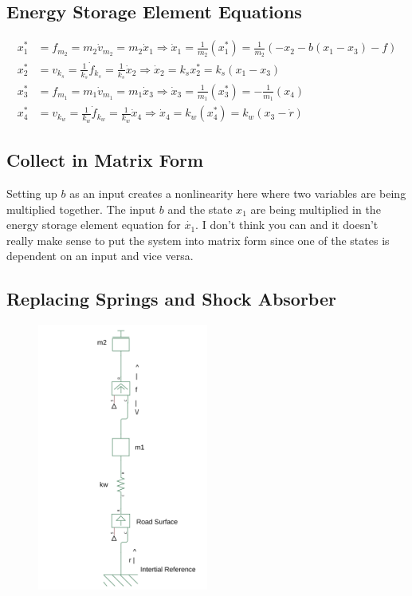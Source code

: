 \documentclass{article}
\begin{document}
\subsection{Energy Storage Element Equations}
\begin{align*}
x^*_1 &= f_{m_2} = m_2 \dot{v}_{m_2} = m_2 \dot{x}_1 \Rightarrow \dot{x}_1 = \frac{1}{m_2} (x_1^*) = \frac{1}{m_2} (-x_2 - b(x_1-x_3) - f) \\
x^*_2 &= v_{k_s} = \frac{1}{k_s} \dot{f}_{k_s} = \frac{1}{k_s} \dot{x}_2 \Rightarrow \dot{x}_2 = k_s x^*_2 = k_s (x_1 - x_3) \\
x^*_3 &= f_{m_1} = m_1 \dot{v}_{m_1} = m_1 \dot{x}_3 \Rightarrow \dot{x}_3 = \frac{1}{m_1} (x_3^*) = -\frac{1}{m_1} (x_4) \\
x^*_4 &= v_{k_w} = \frac{1}{k_w} \dot{f}_{k_w} = \frac{1}{k_w} \dot{x}_4 \Rightarrow \dot{x}_4 = k_w(x^*_4) = k_w (x_3 - \dot{r})
\end{align*}

\subsection{Collect in Matrix Form}

Setting up $b$ as an input creates a nonlinearity here where two variables are being multiplied together.
The input $b$ and the state $x_1$ are being multiplied in the energy storage element equation for $\dot{x_1}$.
I don't think you can and it doesn't really make sense to put the system into matrix form since one of the states is dependent on an input and vice versa.

\subsection*{Replacing Springs and Shock Absorber}

\begin{figure}[H]
    \centering
    \includegraphics[width=0.5\textwidth]{actSusOnlyModel.png}
\end{figure}
\end{document}
